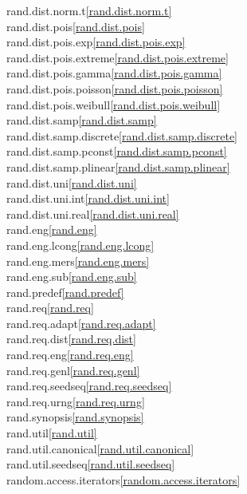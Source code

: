 \begin{multicols}{2}
rand.dist.norm.t\quad\ref{rand.dist.norm.t}\\
rand.dist.pois\quad\ref{rand.dist.pois}\\
rand.dist.pois.exp\quad\ref{rand.dist.pois.exp}\\
rand.dist.pois.extreme\quad\ref{rand.dist.pois.extreme}\\
rand.dist.pois.gamma\quad\ref{rand.dist.pois.gamma}\\
rand.dist.pois.poisson\quad\ref{rand.dist.pois.poisson}\\
rand.dist.pois.weibull\quad\ref{rand.dist.pois.weibull}\\
rand.dist.samp\quad\ref{rand.dist.samp}\\
rand.dist.samp.discrete\quad\ref{rand.dist.samp.discrete}\\
rand.dist.samp.pconst\quad\ref{rand.dist.samp.pconst}\\
rand.dist.samp.plinear\quad\ref{rand.dist.samp.plinear}\\
rand.dist.uni\quad\ref{rand.dist.uni}\\
rand.dist.uni.int\quad\ref{rand.dist.uni.int}\\
rand.dist.uni.real\quad\ref{rand.dist.uni.real}\\
rand.eng\quad\ref{rand.eng}\\
rand.eng.lcong\quad\ref{rand.eng.lcong}\\
rand.eng.mers\quad\ref{rand.eng.mers}\\
rand.eng.sub\quad\ref{rand.eng.sub}\\
rand.predef\quad\ref{rand.predef}\\
rand.req\quad\ref{rand.req}\\
rand.req.adapt\quad\ref{rand.req.adapt}\\
rand.req.dist\quad\ref{rand.req.dist}\\
rand.req.eng\quad\ref{rand.req.eng}\\
rand.req.genl\quad\ref{rand.req.genl}\\
rand.req.seedseq\quad\ref{rand.req.seedseq}\\
rand.req.urng\quad\ref{rand.req.urng}\\
rand.synopsis\quad\ref{rand.synopsis}\\
rand.util\quad\ref{rand.util}\\
rand.util.canonical\quad\ref{rand.util.canonical}\\
rand.util.seedseq\quad\ref{rand.util.seedseq}\\
random.access.iterators\quad\ref{random.access.iterators}\\

\end{multicols}
